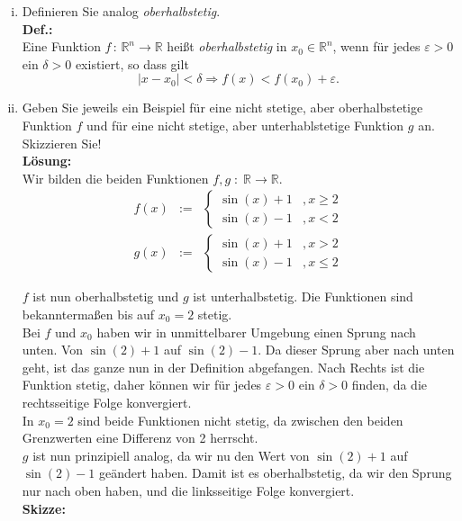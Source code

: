 \documentclass[11pt,a4paper,ngerman]{article}
\begin{document}
\begin{enumerate}[(i)]
	\item Definieren Sie analog \emph{oberhalbstetig}.\\
	\textbf{Def.:}\\
		Eine Funktion $f \, : \, \mathbb{R}^n \rightarrow \mathbb{R}$ heißt \emph{oberhalbstetig} in $x_0 \in \mathbb{R}^n$, wenn für jedes
		$\varepsilon > 0$ ein $\delta > 0$ existiert, so dass gilt
		$$
			| x - x_0 | < \delta \Rightarrow f(x) < f(x_0) + \varepsilon.
		$$

	\item Geben Sie jeweils ein Beispiel für eine nicht stetige, aber oberhalbstetige Funktion $f$ und für eine nicht stetige, aber unterhablstetige 
		Funktion $g$ an. Skizzieren Sie!\\
	\textbf{Lösung:}\\
		Wir bilden die beiden Funktionen $f, g \; : \; \mathbb{R} \rightarrow \mathbb{R}$.\\
		$$\begin{array}{rcl}
			f(x) &:=& \left\{\begin{array}{lr}
				\sin(x) + 1 &, x \geq 2\\
				\sin(x) - 1 &, x < 2 
			\end{array}\right.\\
			g(x) &:=& \left\{\begin{array}{lr}
				\sin(x) + 1 &, x > 2\\
				\sin(x) - 1 &, x \leq 2 
			\end{array}\right.
		\end{array}$$
		
		$f$ ist nun oberhalbstetig und $g$ ist unterhalbstetig. Die Funktionen sind bekanntermaßen bis auf $x_0 = 2$ stetig.\\
		Bei $f$ und $x_0$ haben wir in unmittelbarer Umgebung einen Sprung nach unten. Von $\sin(2)+1$ auf $\sin(2) -1$. 
		Da dieser Sprung aber nach unten geht, ist das ganze nun in der Definition abgefangen. Nach Rechts ist die Funktion stetig,
		daher können wir für jedes $\varepsilon > 0$ ein $\delta > 0$ finden, da die rechtsseitige Folge konvergiert.\\
		In $x_0 = 2$ sind beide Funktionen nicht stetig, da zwischen den beiden Grenzwerten eine Differenz von 2 herrscht.\\

		$g$ ist nun prinzipiell analog, da wir nu den Wert von $\sin(2)+1$ auf $\sin(2) - 1$ geändert haben. Damit ist es
		oberhalbstetig, da wir den Sprung nur nach oben haben, und die linksseitige Folge konvergiert.\\
	\textbf{Skizze:}\\
		


\end{enumerate}
\end{document}

